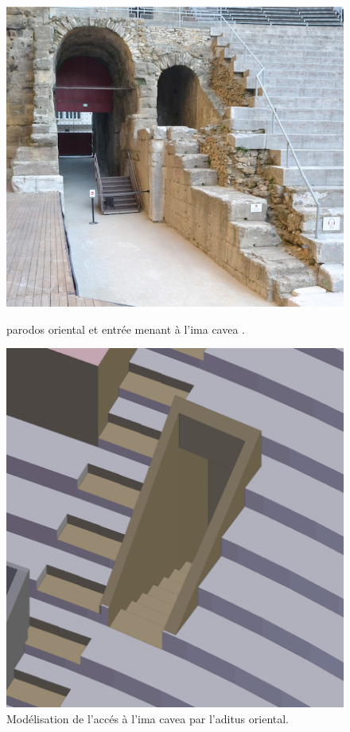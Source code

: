 \begin{figure}[!h]
	\centering
	\begin{subfigureth}{0.49\textwidth}
	\includegraphics[width=\textwidth]{images/parodos}
	\caption[\Gls{parodos} oriental et entrée menant à l'\gls{ima cavea}]{\Gls{parodos} oriental et entrée menant à l'\gls{ima cavea} \footnotemark.} 
	\label{parodos} 
		\end{subfigureth}	
	\begin{subfigureth}{0.4\textwidth}
	\includegraphics[width=\textwidth]{images/acces10emegradin}
	\caption{Modélisation de l'accés à l'\gls{ima cavea} par l'\gls{aditus} oriental.} 
	\label{acces10emegradin} 
	\end{subfigureth}
\end{figure}


